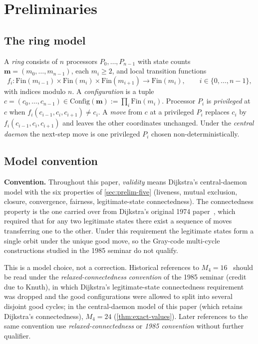 \documentclass[11pt,a4paper]{article}
\theoremstyle{plain}
\theoremstyle{definition}
\newcommand{\Config}{\mathrm{Config}}
\begin{document}
\section{Preliminaries}\label{sec:prelim}

\subsection{The ring model}\label{sec:prelim-ring}

A \emph{ring} consists of $n$ processors $P_0, \ldots, P_{n-1}$ with
state counts $\mathbf{m} = (m_0, \ldots, m_{n-1})$, each $m_i \ge 2$,
and local transition functions
\[
   f_i : \mathrm{Fin}(m_{i-1}) \times \mathrm{Fin}(m_i) \times \mathrm{Fin}(m_{i+1}) \to \mathrm{Fin}(m_i),
   \qquad i \in \{0, \ldots, n-1\},
\]
with indices modulo $n$. A \emph{configuration} is a tuple
$c = (c_0, \ldots, c_{n-1}) \in \Config(\mathbf{m}) := \prod_i \mathrm{Fin}(m_i)$.
Processor $P_i$ is \emph{privileged} at $c$ when
$f_i(c_{i-1}, c_i, c_{i+1}) \ne c_i$.  A \emph{move} from $c$ at a
privileged $P_i$ replaces $c_i$ by $f_i(c_{i-1}, c_i, c_{i+1})$ and
leaves the other coordinates unchanged.  Under the \emph{central daemon}
the next-step move is one privileged $P_i$ chosen non-deterministically.

\subsection{Model convention}\label{sec:prelim-model}

\textbf{Convention.} Throughout this paper, \emph{validity} means
Dijkstra's central-daemon model with the six properties of
\cref{sec:prelim-five} (liveness, mutual exclusion, closure, convergence,
fairness, legitimate-state connectedness).  The connectedness property
is the one carried over from Dijkstra's original 1974
paper~\cite[\S3]{Dijkstra1974}, which required that for any two
legitimate states there exist a sequence of moves transferring one to
the other.  Under this requirement the legitimate states form a single
orbit under the unique good move, so the Gray-code multi-cycle
constructions studied in the 1985 seminar do not qualify.

This is a model choice, not a correction.  Historical references to
$M_4 = 16$~\cite[p.~70]{HaddadKnuth1985} should be read under the
\emph{relaxed-connectedness convention} of the 1985 seminar (credit
due to Knuth), in which Dijkstra's legitimate-state connectedness
requirement was dropped and the good configurations were allowed to
split into several disjoint good cycles; in the central-daemon model
of this paper (which retains Dijkstra's connectedness), $M_4 = 24$
(\cref{thm:exact-values}).  Later references to the same convention
use \emph{relaxed-connectedness} or \emph{1985 convention} without
further qualifier.
\end{document}
